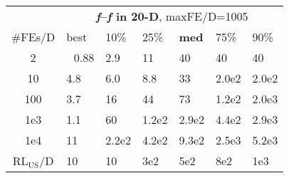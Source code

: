 \begin{tabular}{c|llllll}
 & \multicolumn{6}{|c}{\textbf{\textit{f}\raisebox{-0.35ex}{1}--\textit{f}\raisebox{-0.35ex}{24} in 20-D}, maxFE/D=1005}\\
\#FEs/D & best & 10\% & 25\% & \textbf{med} & 75\% & 90\%\\
2 & ~\,0.88 & \hspace*{1ex}2.9 & 11 & 40 & 40 & 40\\
10 & \hspace*{1ex}4.8 & \hspace*{1ex}6.0 & \hspace*{1ex}8.8 & 33 & 2.0e2 & 2.0e2\\
100 & \hspace*{1ex}3.7 & 16 & 44 & 73 & 1.2e2 & 2.0e3\\
1e3 & \hspace*{1ex}1.1 & 60 & 1.2e2 & 2.9e2 & 4.4e2 & 2.9e3\\
1e4 & 11 & 2.2e2 & 4.2e2 & 9.3e2 & 2.5e3 & 5.2e3\\
$\text{RL}_{\text{US}}$/D & 10 & 10 & 3e2 & 5e2 & 8e2 & 1e3
\end{tabular}
